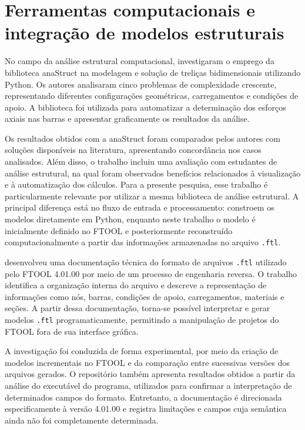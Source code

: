 \section{Ferramentas computacionais e integração de modelos estruturais}
\label{sec:trabalhos-ferramentas-computacionais}

No campo da análise estrutural computacional,  investigaram o emprego da biblioteca anaStruct na modelagem e solução de treliças bidimensionais utilizando Python. Os autores analisaram cinco problemas de complexidade crescente, representando diferentes configurações geométricas, carregamentos e condições de apoio. A biblioteca foi utilizada para automatizar a determinação dos esforços axiais nas barras e apresentar graficamente os resultados da análise.

Os resultados obtidos com a anaStruct foram comparados pelos autores com soluções disponíveis na literatura, apresentando concordância nos casos analisados. Além disso, o trabalho incluiu uma avaliação com estudantes de análise estrutural, na qual foram observados benefícios relacionados à visualização e à automatização dos cálculos. Para a presente pesquisa, esse trabalho é particularmente relevante por utilizar a mesma biblioteca de análise estrutural. A principal diferença está no fluxo de entrada e processamento:  constroem os modelos diretamente em Python, enquanto neste trabalho o modelo é inicialmente definido no \acrshort{FTOOL} e posteriormente reconstruído computacionalmente a partir das informações armazenadas no arquivo \texttt{.ftl}.

 desenvolveu uma documentação técnica do formato de arquivos \texttt{.ftl} utilizado pelo \acrshort{FTOOL} 4.01.00 por meio de um processo de engenharia reversa. O trabalho identifica a organização interna do arquivo e descreve a representação de informações como nós, barras, condições de apoio, carregamentos, materiais e seções. A partir dessa documentação, torna-se possível interpretar e gerar modelos \texttt{.ftl} programaticamente, permitindo a manipulação de projetos do \acrshort{FTOOL} fora de sua interface gráfica.

A investigação foi conduzida de forma experimental, por meio da criação de modelos incrementais no \acrshort{FTOOL} e da comparação entre sucessivas versões dos arquivos gerados. O repositório também apresenta resultados obtidos a partir da análise do executável do programa, utilizados para confirmar a interpretação de determinados campos do formato. Entretanto, a documentação é direcionada especificamente à versão 4.01.00 e registra limitações e campos cuja semântica ainda não foi completamente determinada.

